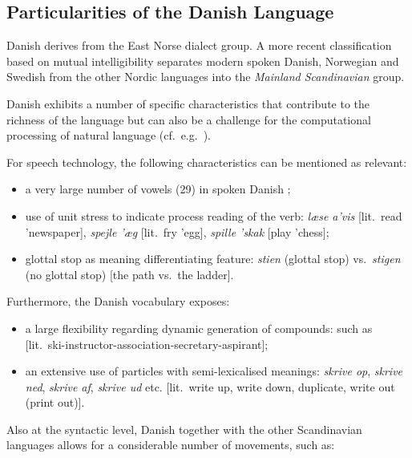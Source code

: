 \documentclass[]{../../metanetpaper}
\begin{document}
\begin{multicols}{2}
\subsection{Particularities of the Danish Language}

 Danish derives from the East Norse dialect group. A more recent classification based on mutual intelligibility separates modern spoken Danish, Norwegian and Swedish from the other Nordic languages into the {\it Mainland Scandinavian} group.

Danish exhibits a number of specific characteristics that contribute to the richness of the language but can also be a challenge for the computational processing of natural language (cf.\ e.g.\ \cite{Gregersen, Hellan, Braasch}). 


For speech technology, the following characteristics can be mentioned as relevant:
\begin{itemize}
\item a very large number of vowels (29) in spoken Danish \cite{dansk}; 
\item	use of unit stress to indicate process reading of the verb: {\it l\ae se a'vis} [lit.\ read 'newspaper], {\it spejle '\ae g} [lit.\ fry 'egg],  {\it spille 'skak} [play 'chess];
\item	glottal stop as meaning differentiating feature: {\it stien} (glottal stop) vs.\ {\it stigen} (no glottal stop) [the path vs.\ the ladder].
\end{itemize}

Furthermore, the Danish vocabulary exposes:
\begin{itemize}
\item a large flexibility regarding dynamic generation of compounds: such as  [lit.\ ski-instructor-asso\-ciation-secretary-as\-pir\-ant]; 
\item	an extensive use of particles with semi-lexicalised meanings: {\it skrive op}, {\it skrive ned}, {\it skrive af}, {\it skrive ud} etc. [lit.\ write up, write down, duplicate, write out (print out)].
\end{itemize}
Also at the syntactic level, Danish together with the other Scandinavian languages allows for a considerable number of movements, such as:


\end{multicols}
\end{document}

